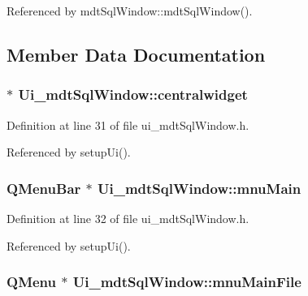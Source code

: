 Referenced by mdt\-Sql\-Window\-::mdt\-Sql\-Window().



\subsection{Member Data Documentation}
\hypertarget{class_ui__mdt_sql_window_ad4fe69de0e25edbc0b197f0bcf62632a}{
\subsubsection[{centralwidget}]{ $\ast$ Ui\-\_\-mdt\-Sql\-Window\-::centralwidget}}\label{class_ui__mdt_sql_window_ad4fe69de0e25edbc0b197f0bcf62632a}


Definition at line 31 of file ui\-\_\-mdt\-Sql\-Window.\-h.



Referenced by setup\-Ui().

\hypertarget{class_ui__mdt_sql_window_a2cdcd27d2a4c021236a1d2adfa483cb5}{
\subsubsection[{mnu\-Main}]{\setlength{\rightskip}{0pt plus 5cm}Q\-Menu\-Bar $\ast$ Ui\-\_\-mdt\-Sql\-Window\-::mnu\-Main}}\label{class_ui__mdt_sql_window_a2cdcd27d2a4c021236a1d2adfa483cb5}


Definition at line 32 of file ui\-\_\-mdt\-Sql\-Window.\-h.



Referenced by setup\-Ui().

\hypertarget{class_ui__mdt_sql_window_aad9106c68c6839271df273119b5b74c8}{
\subsubsection[{mnu\-Main\-File}]{\setlength{\rightskip}{0pt plus 5cm}Q\-Menu $\ast$ Ui\-\_\-mdt\-Sql\-Window\-::mnu\-Main\-File}}\label{class_ui__mdt_sql_window_aad9106c68c6839271df273119b5b74c8}


